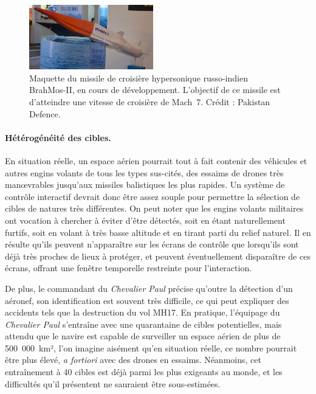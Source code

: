 	\begin{figure} %
		\centering
		\includegraphics[width=0.48\textwidth]{figures/ch1/brahmos-II}
		\caption[Missile hypersonique BrahMos-II.]{Maquette du missile de croisière hypersonique russo-indien BrahMos-II, en cours de développement. L'objectif de ce missile est d'atteindre une vitesse de croisière de Mach~7\footnotemark. Crédit : Pakistan Defence\footnotemark.}
		\label{fig:brahmos}
	\end{figure}
	
	\addtocounter{footnote}{-1}
	\addtocounter{footnote}{1}
	
	\paragraph{Hétérogénéité des cibles.}
	En situation réelle, un espace aérien pourrait tout à fait contenir des véhicules et autres engins volants de tous les types sus-cités, des essaims de drones très manœvrables jusqu'aux missiles balistiques les plus rapides. Un système de contrôle interactif devrait donc être assez souple pour permettre la sélection de cibles de natures très différentes.
	On peut noter que les engins volants militaires ont vocation à chercher à éviter d'être détectés, soit en étant naturellement furtifs, soit en volant à très basse altitude et en tirant parti du relief naturel. Il en résulte qu'ils peuvent n'apparaître sur les écrans de contrôle que lorsqu'ils sont déjà très proches de lieux à protéger, et peuvent éventuellement disparaître de ces écrans, offrant une fenêtre temporelle restreinte pour l'interaction.
	
	De plus, le commandant du \emph{Chevalier Paul}\footnotemark{} précise qu'outre la détection d'un aéronef, son identification est souvent très difficile, ce qui peut expliquer des accidents tels que la destruction du vol MH17\footnotemark{}. En pratique, l'équipage du \emph{Chevalier Paul} s'entraîne avec une quarantaine de cibles potentielles, mais attendu que le navire est capable de surveiller un espace aérien de plus de 500~000~km², l'on imagine aisément qu'en situation réelle, ce nombre pourrait être plus élevé, \emph{a fortiori} avec des drones en essaims. Néanmoins, cet entraînement à 40 cibles est déjà parmi les plus exigeants au monde, et les difficultés qu'il présentent ne sauraient être sous-estimées.
	
